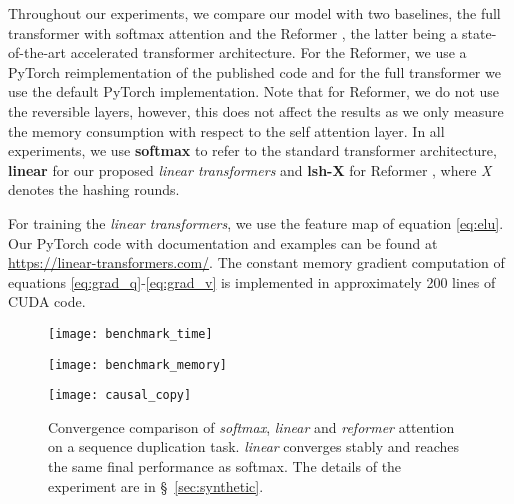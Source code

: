 \documentclass{article}
\newcommand{\linears}{\emph{linear transformers}}
\begin{document}
Throughout our experiments, we compare our model with two baselines, the full
transformer with softmax attention and the Reformer \cite{kitaev2020reformer},
the latter being a state-of-the-art accelerated transformer architecture. For
the Reformer, we use a PyTorch reimplementation of the published code
and for the full transformer we use the default PyTorch implementation.
Note that for Reformer, we do not use the reversible layers, however,
this does not affect the results as we only measure the memory consumption with
respect to the self attention layer. In all experiments, we use
\textbf{softmax} \cite{vaswani_attn} to refer to the standard transformer
architecture, \textbf{linear} for our proposed \linears{} and
\textbf{lsh-X} for Reformer \cite{kitaev2020reformer}, where \emph{X} denotes
the hashing rounds.

For training the \linears{}, we use the feature map of equation
\ref{eq:elu}. Our PyTorch \cite{paszke2019pytorch} code with documentation and
examples can be found at \url{https://linear-transformers.com/}. The constant
memory gradient computation of equations \ref{eq:grad_q}-\ref{eq:grad_v} is
implemented in approximately 200 lines of CUDA code.

\begin{figure*}
    \centering
    \begin{subfigure}[t]{\columnwidth}
        \texttt{[image: benchmark\_time]}
    \end{subfigure}
    \begin{subfigure}[t]{\columnwidth}
        \texttt{[image: benchmark\_memory]}
    \end{subfigure}
    \caption{Comparison of the computational requirements for a forward/backward pass for
             Reformer (lsh-X), softmax attention and linear attention. Linear
             and Reformer models scale linearly with the sequence length unlike
             softmax which scales with the square of the sequence length both
             in memory and time. Full details of the experiment can be found in
             \S~\ref{sec:synthetic}.}
    \label{fig:benchmark}
\end{figure*}

\begin{figure}
    \centering
    \texttt{[image: causal\_copy]}
    \caption{Convergence comparison of \emph{softmax}, \emph{linear} and
             \emph{reformer} attention on a sequence duplication task.
             \emph{linear} converges stably and reaches the same final
             performance as softmax. The details of the experiment are in
             \S~\ref{sec:synthetic}.}
    \label{fig:causal-copy}
\end{figure}
\end{document}
